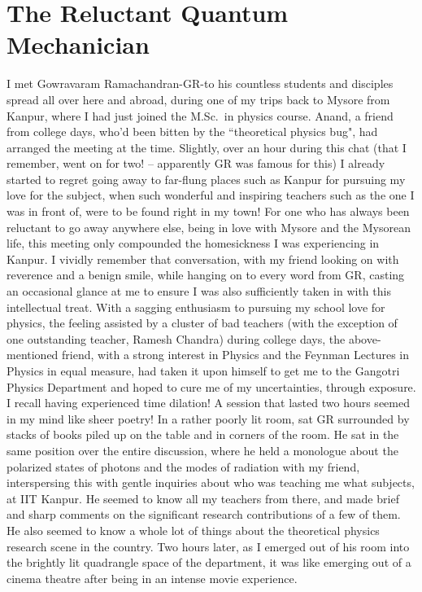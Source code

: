 \chapter[The Reluctant Quantum Mechanician]{The Reluctant Quantum Mechanician}\label{chap22}



I met Gowravaram Ramachandran-GR-to his countless students and disciples spread all over here and abroad, during one of my trips back to Mysore from Kanpur, where I had just joined the M.Sc.\ in physics course. Anand, a friend from college days, who'd been bitten by the ``theoretical physics bug", had arranged the meeting at the time. Slightly, over an hour during this chat (that I remember, went on for two! -- apparently GR was famous for this) I already started to regret going away to far-flung places such as Kanpur for pursuing my love for the subject, when such wonderful and inspiring teachers such as the one I was in front of, were to be found right in my town! For one who has always been reluctant to go away anywhere else, being in love with Mysore and the Mysorean life, this meeting only compounded the homesickness I was experiencing in Kanpur. I vividly remember that conversation, with my friend looking on with reverence and a benign smile, while hanging on to every word from GR, casting an occasional glance at me to ensure I was also sufficiently taken in with this intellectual treat. With a sagging enthusiasm to pursuing my school love for physics, the feeling assisted by a cluster of bad teachers (with the exception of one outstanding teacher, Ramesh Chandra) during college days, the above-mentioned friend, with a strong interest in Physics and the Feynman Lectures in Physics in equal measure, had taken it upon himself to get me to the Gangotri Physics Department and hoped to cure me of my uncertainties, through exposure. I recall having experienced time dilation!  A session that lasted two hours seemed in my mind like sheer poetry! In a rather poorly lit room, sat GR surrounded by stacks of books piled up on the table and in corners of the room. He sat in the same position over the entire discussion, where he held a monologue about the polarized states of photons and the modes of radiation with my friend, interspersing this with gentle inquiries about who was teaching me what subjects, at IIT Kanpur. He seemed to know all my teachers from there, and made brief and sharp comments on the significant research contributions of a few of them. He also seemed to know a whole lot of things about the theoretical physics research scene in the country. Two hours later, as I emerged out of his room into the brightly lit quadrangle space of the department, it was like emerging out of a cinema theatre after being in an intense movie experience. 

